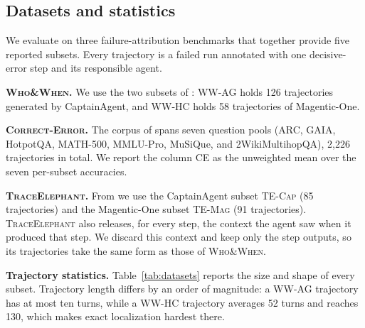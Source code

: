\subsection{Datasets and statistics}
\label{app:datasets}

We evaluate on three failure-attribution benchmarks that together provide five reported subsets. Every trajectory is a failed run annotated with one decisive-error step and its responsible agent.

\textbf{\textsc{Who\&When}.}
We use the two subsets of \citet{whoandwhen}: \textsc{WW-AG} holds 126 trajectories generated by CaptainAgent, and \textsc{WW-HC} holds 58 trajectories of Magentic-One. 

\textbf{\textsc{Correct-Error}.}
The corpus of \citet{correct} spans seven question pools (ARC, GAIA, HotpotQA, MATH-500, MMLU-Pro, MuSiQue, and 2WikiMultihopQA), 2{,}226 trajectories in total. We report the column \textsc{CE} as the unweighted mean over the seven per-subset accuracies.

\textbf{\textsc{TraceElephant}.}
From \citet{traceelephant} we use the CaptainAgent subset \textsc{TE-Cap} (85
trajectories) and the Magentic-One subset \textsc{TE-Mag} (91 trajectories).
\textsc{TraceElephant} also releases, for every step, the context the agent saw when it
produced that step. We discard this context and keep only the step outputs, so its
trajectories take the same form as those of \textsc{Who\&When}.

\textbf{Trajectory statistics.}
Table~\ref{tab:datasets} reports the size and shape of every subset. Trajectory
length differs by an order of magnitude: a \textsc{WW-AG} trajectory has at most ten turns,
while a \textsc{WW-HC} trajectory averages 52 turns and reaches 130, which makes exact
localization hardest there.


